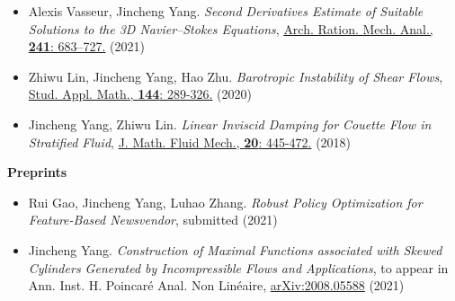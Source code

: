 \documentclass[margin,line]{res}
\begin{document}
\begin{resume}
\begin{itemize}[leftmargin=0.15in, label=$\sqbullet$]
    
    \item Alexis Vasseur, Jincheng Yang. \textit{Second Derivatives Estimate of Suitable Solutions to the 3D Navier--Stokes Equations},  \href{https://doi.org/10.1007/s00205-021-01661-4}{Arch. Ration. Mech. Anal., \textbf{241}: 683–727.} (2021)

    \item Zhiwu Lin, Jincheng Yang, Hao Zhu. \textit{Barotropic Instability of Shear Flows}, 
    \href{https://doi.org/10.1111/sapm.12297}{Stud. Appl. Math., \textbf{144}: 289-326.} (2020)
    
    \item Jincheng Yang, Zhiwu Lin. \textit{Linear Inviscid Damping for Couette Flow in Stratified Fluid}, \href{https://doi.org/10.1007/s00021-017-0328-3}{J. Math. Fluid Mech., \textbf{20}: 445-472.} (2018)
\end{itemize}

{\bf Preprints}
\vvspace

\begin{itemize}[leftmargin=0.15in, label=$\sqbullet$]

    \item Rui Gao, Jincheng Yang, Luhao Zhang. \textit{Robust Policy Optimization for Feature-Based Newsvendor}, submitted (2021) 

    \item Jincheng Yang. \textit{Construction of Maximal Functions associated with Skewed Cylinders Generated by Incompressible Flows and Applications}, to appear in 
    Ann. Inst. H. Poincar\'e Anal. Non Lin\'eaire,
    \href{https://arxiv.org/abs/2008.05588}{arXiv:2008.05588} (2021)
    
\end{itemize}





\end{resume}
\end{document}
